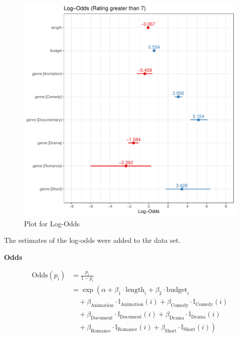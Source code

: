 \documentclass[
  letterpaper,
  DIV=11,
  numbers=noendperiod]{scrartcl}
\begin{document}
\begin{figure}

{\centering \includegraphics{Group_06_Analysis_files/figure-pdf/fig-logodds-1.pdf}

}

\caption{\label{fig-logodds}Plot for Log-Odds}

\end{figure}

\clearpage

The estimates of the log-odds were added to thr data set.

\textbf{Odds}

\[\begin{aligned}
\text{Odds}(p_i) &= \frac{p_i}{1 - p_i} \\
&= \exp\left(\alpha + \beta_1 \cdot \text{length}_i + \beta_2 \cdot \text{budget}_i \right. \\
&\quad + \beta_{\text{Animation}} \cdot \mathbb{I}_{\text{Animation}}(i) + \beta_{\text{Comedy}} \cdot \mathbb{I}_{\text{Comedy}}(i) \\
&\quad + \beta_{\text{Document}} \cdot \mathbb{I}_{\text{Document}}(i) + \beta_{\text{Drama}} \cdot \mathbb{I}_{\text{Drama}}(i) \\
&\quad + \left. \beta_{\text{Romance}} \cdot \mathbb{I}_{\text{Romance}}(i) + \beta_{\text{Short}} \cdot \mathbb{I}_{\text{Short}}(i)\right)
\end{aligned}\]
\end{document}
